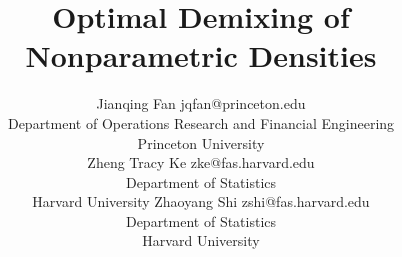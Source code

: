 \documentclass[preprint,11pt]{article}
\numberwithin{equation}{section}
\begin{document}
\title{Optimal Demixing of Nonparametric Densities}

\author{\name Jianqing Fan \email jqfan@princeton.edu \\
       \addr Department of Operations Research and Financial Engineering\\
Princeton University\\
       \AND
       \name Zheng Tracy Ke \email zke@fas.harvard.edu \\
       \addr Department of Statistics\\
Harvard University
        \AND
       \name Zhaoyang Shi \email zshi@fas.harvard.edu \\
       \addr Department of Statistics\\
Harvard University}


\maketitle
\end{document}
